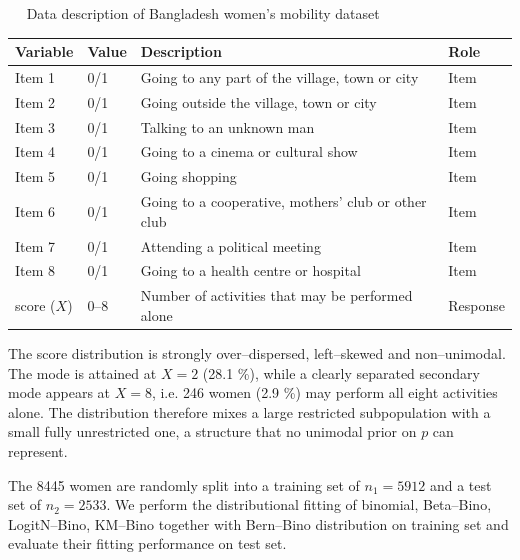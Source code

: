 \vkU
\baselineskip 0.10in
\begin{Table} \label{zyf.BSB.tab4} {\rm  \ \  \hspace*{-0.5cm}{\bf .}
Data description of Bangladesh women's mobility dataset
\vspace{-0.3cm}
\begin{center}
\renewcommand{\arraystretch}{1.2} \tabcolsep 0.135in \doublerulesep 0.2pt
\begin{tabular}{llll}  \hline\hline
    Variable & Value & Description & Role \\ \hline
    Item 1 & 0/1 & Going to any part of the village, town or city & Item \\ 
    Item 2 & 0/1 & Going outside the village, town or city & Item \\ 
    Item 3 & 0/1 & Talking to an unknown man & Item \\ 
    Item 4 & 0/1 & Going to a cinema or cultural show & Item \\
    Item 5 & 0/1 & Going shopping & Item \\ 
    Item 6 & 0/1 & Going to a cooperative, mothers' club or other club & Item \\
    Item 7 & 0/1 & Attending a political meeting & Item \\ 
    Item 8 & 0/1 & Going to a health centre or hospital & Item \\
    score ($X$) & 0--8 & Number of activities that may be performed alone & Response \\ \hline\hline
\end{tabular}
\end{center} }
\end{Table}
\vspace{-0.3cm}
\baselineskip 0.30in

\vkL
The score distribution is strongly over--dispersed, left--skewed and non--unimodal. The mode is attained at $X = 2$ (28.1 \%), while a clearly separated secondary mode appears at $X = 8$, i.e. 246 women (2.9 \%) may perform all eight activities alone. The distribution therefore mixes a large restricted subpopulation with a small fully unrestricted one, a structure that no unimodal prior on $p$ can represent.

The 8445 women are randomly split into a training set of $n_1 = 5912$ and a test set of $n_2 = 2533$. We perform the distributional fitting of binomial, Beta--Bino, LogitN--Bino, KM--Bino together with Bern--Bino distribution on training set and evaluate their fitting performance on test set.

